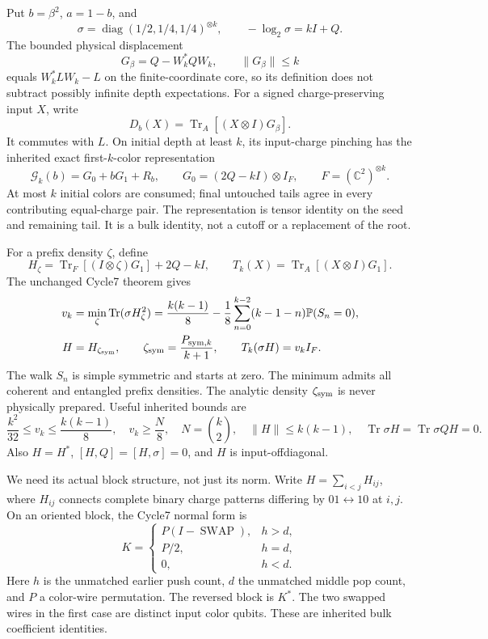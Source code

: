 \documentclass[11pt]{article}
\newcommand{\Tr}{\operatorname{Tr}}
\newcommand{\norm}[1]{\lVert #1\rVert}
\newcommand{\Prob}{\mathbb P}
\newcommand{\SWAP}{\operatorname{SWAP}}
\begin{document}
Put \(b=\beta^2\), \(a=1-b\), and
\[
 \sigma=\operatorname{diag}(1/2,1/4,1/4)^{\otimes k},
 \qquad-\log_2\sigma=kI+Q.
\]
The bounded physical displacement
\[
 G_\beta=Q-W_k^*QW_k,\qquad \norm{G_\beta}\le k
\]
equals \(W_k^*LW_k-L\) on the finite-coordinate core, so its definition
does not subtract possibly infinite depth expectations.
For a signed charge-preserving input \(X\), write
\[
 D_b(X)=\Tr_A[(X\otimes I)G_\beta].
\]
It commutes with \(L\). On initial depth at least \(k\), its input-charge
pinching has the inherited exact first-\(k\)-color representation
\[
 \mathcal G_k(b)=G_0+bG_1+R_b,\qquad
 G_0=(2Q-kI)\otimes I_F,\qquad F=(\mathbb C^2)^{\otimes k}.
\]
At most \(k\) initial colors are consumed; final untouched tails agree in
every contributing equal-charge pair. The representation is tensor identity
on the seed and remaining tail. It is a bulk identity, not a cutoff or a
replacement of the root.

For a prefix density \(\zeta\), define
\[
 H_\zeta=\Tr_F[(I\otimes\zeta)G_1]+2Q-kI,\qquad
 T_k(X)=\Tr_A[(X\otimes I)G_1].
\]
The unchanged Cycle7 theorem gives
\begin{align}
 v_k&=\min_{\zeta}\Tr(\sigma H_\zeta^2)
 =\frac{k(k-1)}8-\frac18
   \sum_{n=0}^{k-2}(k-1-n)\Prob(S_n=0),\label{eq:vk}\\
 H&=H_{\zeta_{\rm sym}},\qquad
 \zeta_{\rm sym}=\frac{P_{{\rm sym},k}}{k+1},
 \qquad T_k(\sigma H)=v_kI_F.\label{eq:scalar}
\end{align}
The walk \(S_n\) is simple symmetric and starts at zero. The minimum admits
all coherent and entangled prefix densities. The analytic density
\(\zeta_{\rm sym}\) is never physically prepared. Useful inherited bounds are
\begin{equation}\label{eq:inherited}
 \frac{k^2}{32}\le v_k\le\frac{k(k-1)}8,\quad
 v_k\ge\frac N8,\quad N=\binom{k}{2},\quad
 \norm H\le k(k-1),\quad
 \Tr\sigma H=\Tr\sigma QH=0.
\end{equation}
Also \(H=H^*\), \([H,Q]=[H,\sigma]=0\), and \(H\) is input-offdiagonal.

We need its actual block structure, not just its norm. Write
\(H=\sum_{i<j}H_{ij}\), where \(H_{ij}\) connects complete binary charge
patterns differing by \(01\leftrightarrow10\) at \(i,j\).
On an oriented block, the Cycle7 normal form is
\begin{equation}\label{eq:Hblocks}
 K=
 \begin{cases}
 P(I-\SWAP),&h>d,\\
 P/2,&h=d,\\
 0,&h<d.
 \end{cases}
\end{equation}
Here \(h\) is the unmatched earlier push count, \(d\) the unmatched
middle pop count, and \(P\) a color-wire permutation. The reversed block
is \(K^*\). The two swapped wires in the first case are distinct input
color qubits. These are inherited bulk coefficient identities.
\end{document}
